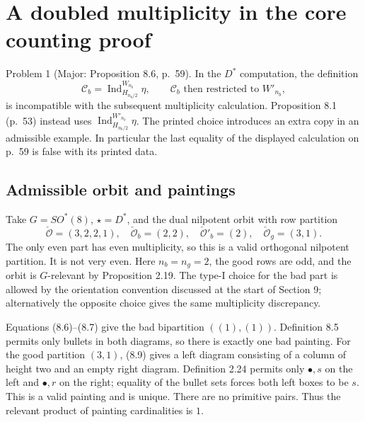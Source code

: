 \documentclass[10pt]{article}
\begin{document}
\section*{A doubled multiplicity in the core counting proof}
Problem 1 (Major: Proposition 8.6, p. 59).  In the \(D^*\) computation, the definition \[\mathcal C_b=\operatorname{Ind}_{H_{n_b/2}}^{W_{n_b}}\eta,
 \qquad \mathcal C_b\text{ then restricted to }W'_{n_b},\] is incompatible with the subsequent multiplicity calculation. Proposition 8.1 (p. 53) instead uses \(\operatorname{Ind}_{H_{n_b/2}}^{W'_{n_b}}\eta\). The printed choice introduces an extra copy in an admissible example. In particular the last equality of the displayed calculation on p. 59 is false with its printed data.\par
\subsection*{Admissible orbit and paintings}
Take \(G=SO^*(8)\), \(\star=D^*\), and the dual nilpotent orbit with row partition \[\check{\mathcal O}=(3,2,2,1),\quad
 \check{\mathcal O}_b=(2,2),\quad
 \check{\mathcal O}'_b=(2),\quad
 \check{\mathcal O}_g=(3,1).\] The only even part has even multiplicity, so this is a valid orthogonal nilpotent partition. It is not very even. Here \(n_b=n_g=2\), the good rows are odd, and the orbit is \(G\)-relevant by Proposition 2.19. The type-I choice for the bad part is allowed by the orientation convention discussed at the start of Section 9; alternatively the opposite choice gives the same multiplicity discrepancy.\par
Equations (8.6)–(8.7) give the bad bipartition \(((1),(1))\). Definition 8.5 permits only bullets in both diagrams, so there is exactly one bad painting. For the good partition \((3,1)\), (8.9) gives a left diagram consisting of a column of height two and an empty right diagram. Definition 2.24 permits only \(\bullet,s\) on the left and \(\bullet,r\) on the right; equality of the bullet sets forces both left boxes to be \(s\). This is a valid painting and is unique. There are no primitive pairs. Thus the relevant product of painting cardinalities is \(1\).\par
\end{document}
